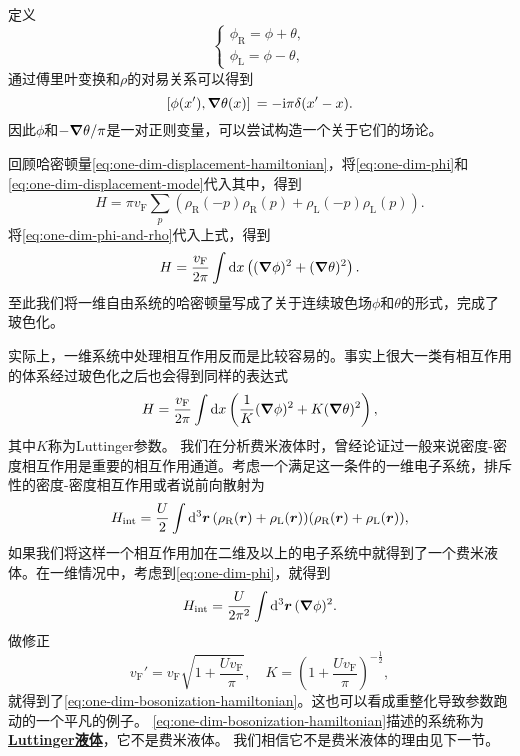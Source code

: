 \documentclass[hyperref, UTF8, a4paper]{ctexart}
\newcommand*{\ii}{\mathrm{i}}
\newcommand*{\concept}[1]{\underline{\textbf{#1}}}
\begin{document}
定义
\begin{equation}
    \begin{cases}
        {\phi}_\text{R} = {\phi} + {\theta}, \\
        {\phi}_\text{L} = {\phi} - {\theta},
    \end{cases}
\end{equation}
通过傅里叶变换和${\rho}$的对易关系可以得到
\begin{equation}
    \comm*{{\phi}(x')}{\grad {\theta}(x)} = -\ii \pi \delta(x' - x).
\end{equation}
因此$\phi$和$- \grad{\theta} / \pi$是一对正则变量，可以尝试构造一个关于它们的场论。

回顾哈密顿量\eqref{eq:one-dim-displacement-hamiltonian}，将\eqref{eq:one-dim-phi}和\eqref{eq:one-dim-displacement-mode}代入其中，得到
\[
    {H} = \pi v_\text{F} \sum_p \left( {\rho}_\text{R}(-p) {\rho}_\text{R}(p) + {\rho}_\text{L}(-p) {\rho}_\text{L}(p) \right).
\]
将\eqref{eq:one-dim-phi-and-rho}代入上式，得到
\begin{equation}
    H = \frac{v_\text{F}}{2\pi} \int \dd{x} \left( (\grad{\phi})^2 + (\grad{\theta})^2 \right).
\end{equation}
至此我们将一维自由系统的哈密顿量写成了关于连续玻色场$\phi$和$\theta$的形式，完成了玻色化。

实际上，一维系统中处理相互作用反而是比较容易的。事实上很大一类有相互作用的体系经过玻色化之后也会得到同样的表达式
\begin{equation}
    H = \frac{v_\text{F}}{2\pi} \int \dd{x} \left( \frac{1}{K} (\grad{\phi})^2 + K (\grad{\theta})^2 \right),
    \label{eq:one-dim-bosonization-hamiltonian}
\end{equation}
其中$K$称为Luttinger参数。
我们在分析费米液体时，曾经论证过一般来说密度-密度相互作用是重要的相互作用通道。考虑一个满足这一条件的一维电子系统，排斥性的密度-密度相互作用或者说前向散射为
\begin{equation}
    {H}_\text{int} = \frac{U}{2} \int \dd[3]{\vb*{r}} ({\rho}_\text{R}(\vb*{r}) + {\rho}_\text{L}(\vb*{r})) ({\rho}_\text{R}(\vb*{r}) + {\rho}_\text{L}(\vb*{r})),
\end{equation}
如果我们将这样一个相互作用加在二维及以上的电子系统中就得到了一个费米液体。在一维情况中，考虑到\eqref{eq:one-dim-phi}，就得到
\begin{equation}
    {H}_\text{int} = \frac{U}{2\pi^2} \int \dd[3]{\vb*{r}} (\grad{\phi})^2.
\end{equation}
做修正
\begin{equation}
    v_\text{F}' = v_\text{F} \sqrt{1 + \frac{U v_\text{F}}{\pi}}, \quad K = \left( 1 + \frac{U v_\text{F}}{\pi} \right)^{- \frac{1}{2}},
\end{equation}
就得到了\eqref{eq:one-dim-bosonization-hamiltonian}。这也可以看成重整化导致参数跑动的一个平凡的例子。
\eqref{eq:one-dim-bosonization-hamiltonian}描述的系统称为\concept{Luttinger液体}，它不是费米液体。
我们相信它不是费米液体的理由见下一节。
\end{document}
